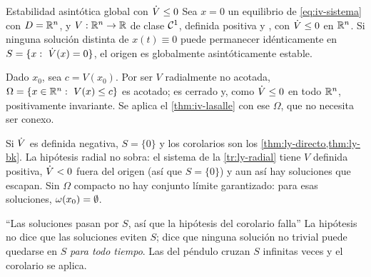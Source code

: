 \begin{corolario}[label=cor:iv-gas]{Estabilidad asintótica global con $\dot V\le0$ \citep[Cor.~4.2]{Kha02}}
Sea $x=0$ un equilibrio de \eqref{eq:iv-sistema} con $D=\mathbb{R}^n$, y $V:\mathbb{R}^n\to\mathbb{R}$ de clase $\mathcal{C}^{1}$, definida positiva y , con $\dot V\le0$ en $\mathbb{R}^n$. Si ninguna solución distinta de $x(t)\equiv0$ puede permanecer idénticamente en $S=\{x:\ \Vdot(x)=0\}$, el origen es globalmente asintóticamente estable.
\end{corolario}

\begin{demostracion}
Dado $x_0$, sea $c=V(x_0)$. Por ser $V$ radialmente no acotada, $\Omega=\{x\in\R^n:\ V(x)\le c\}$ es acotado; es cerrado y, como $\dot V\le0$ en todo $\mathbb{R}^n$, positivamente invariante. Se aplica el \cref{thm:iv-lasalle} con ese $\Omega$, que no necesita ser conexo.
\end{demostracion}

Si $\dot V$ es definida negativa, $S=\{0\}$ y los corolarios son los \cref{thm:ly-directo,thm:ly-bk}. La hipótesis radial no sobra: el sistema de la \cref{tr:ly-radial} tiene $V$ definida positiva, $\dot V<0$ fuera del origen (así que $S=\{0\}$) y aun así hay soluciones que escapan. Sin $\Omega$ compacto no hay conjunto límite garantizado: para esas soluciones, $\omega(x_0)=\emptyset$.

\begin{trampa}[label=tr:iv-pasar]{``Las soluciones pasan por $S$, así que la hipótesis del corolario falla''}
La hipótesis no dice que las soluciones eviten $S$; dice que ninguna solución no trivial puede quedarse en $S$ \emph{para todo tiempo}. Las del péndulo cruzan $S$ infinitas veces y el corolario se aplica.
\end{trampa}

